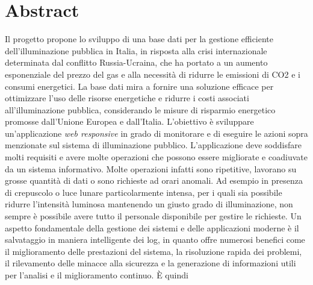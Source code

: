 \section{Abstract}

Il progetto propone lo sviluppo di una base dati per la gestione efficiente dell'illuminazione pubblica in Italia, in risposta alla crisi internazionale determinata dal conflitto Russia-Ucraina, che ha portato a un aumento esponenziale del prezzo del gas e alla necessità di ridurre le emissioni di CO2 e i consumi energetici. La base dati mira a fornire una soluzione efficace per ottimizzare l'uso delle risorse energetiche e ridurre i costi associati all'illuminazione pubblica, considerando le misure di risparmio energetico promosse dall'Unione Europea e dall'Italia.
L’obiettivo è sviluppare un’applicazione {\it{web responsive}} in grado di monitorare e di eseguire le azioni sopra menzionate sul sistema di illuminazione pubblico. L'applicazione deve soddisfare molti requisiti e avere molte operazioni che possono essere migliorate e coadiuvate da un sistema informativo. Molte operazioni infatti sono ripetitive, lavorano su grosse quantità di dati o sono richieste ad orari anomali. Ad esempio in presenza di crepuscolo o luce lunare particolarmente intensa, per i quali sia possibile ridurre l’intensità luminosa mantenendo un giusto grado di illuminazione, non sempre è possibile avere tutto il personale disponibile per gestire le richieste.
Un aspetto fondamentale della gestione dei sistemi e delle applicazioni moderne è il salvataggio in maniera intelligente dei log, in quanto offre numerosi benefici come il miglioramento delle prestazioni del sistema, la risoluzione rapida dei problemi, il rilevamento delle minacce alla sicurezza e la generazione di informazioni utili per l'analisi e il miglioramento continuo. È quindi 
